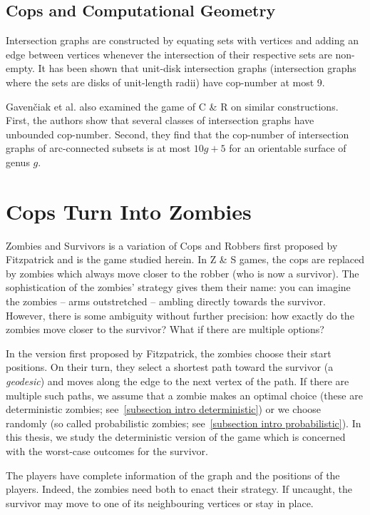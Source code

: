 \subsection{Cops and Computational Geometry}

Intersection graphs are constructed by equating sets with vertices and adding an edge between vertices whenever the intersection of their respective sets are non-empty. It has been shown \cite{beveridge2011cops} that unit-disk intersection graphs (intersection graphs where the sets are disks of unit-length radii) have cop-number at most 9.

Gaven{\v{c}}iak et al. \cite{gavenvciak2018cops} also examined the game of C \& R on similar constructions. First, the authors show that several classes of intersection graphs have unbounded cop-number. Second, they find that the cop-number of intersection graphs of arc-connected subsets is at most $10g+5$ for an orientable surface of genus $g$.

\section{Cops Turn Into Zombies}

Zombies and Survivors is a variation of Cops and Robbers first proposed by Fitzpatrick \cite{fitzpatrick2016deterministic} and is the game studied herein. In Z \& S games, the
cops are replaced by zombies which always move closer to the robber (who is now a survivor). The sophistication of the zombies' strategy gives them their name: you can imagine the zombies -- arms outstretched -- ambling directly towards the survivor. However, there is some ambiguity without further precision: how exactly do the zombies move closer to the survivor? What if there are multiple options?

In the version first proposed by Fitzpatrick, the zombies choose their start positions. On their turn, they select a shortest path toward the survivor (a \textit{geodesic}) and moves along the edge to the next vertex of the path. If there are multiple such paths, we assume that a zombie makes an optimal choice (these are deterministic zombies; see~\ref{subsection intro deterministic}) or we choose randomly (so called probabilistic zombies; see~\ref{subsection intro probabilistic}). In this thesis, we study the deterministic version of the game which is concerned with the worst-case outcomes for the survivor.

The players have complete information of the graph and the positions of the players. Indeed, the zombies need both to enact their strategy. If uncaught, the survivor may move to one of its neighbouring vertices or stay in place.

